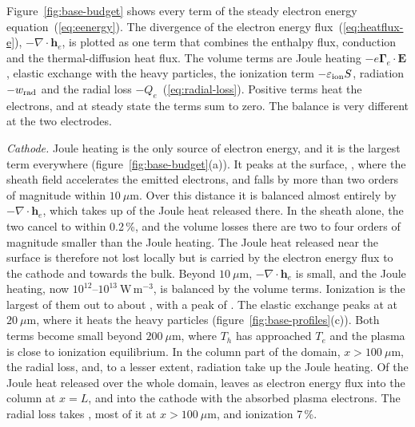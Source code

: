 Figure~\ref{fig:base-budget} shows every term of the steady electron energy equation~(\ref{eq:eenergy}). The divergence of the electron energy flux~(\ref{eq:heatflux-e}), \(-\nabla\cdot\mathbf{h}_e\), is plotted as one term that combines the enthalpy flux, conduction and the thermal-diffusion heat flux. The volume terms are Joule heating \(-e\boldsymbol{\Gamma}_e\cdot\mathbf{E}\), elastic exchange with the heavy particles, the ionization term \(-\varepsilon_{\rm ion}S\), radiation \(-w_{\rm rad}\) and the radial loss \(-Q_e\)~(\ref{eq:radial-loss}). Positive terms heat the electrons, and at steady state the terms sum to zero. The balance is very different at the two electrodes.

\emph{Cathode.} Joule heating is the only source of electron energy, and it is the largest term everywhere (figure~\ref{fig:base-budget}(a)). It peaks at the surface, , where the sheath field accelerates the emitted electrons, and falls by more than two orders of magnitude within \(10\ \mu\)m. Over this distance it is balanced almost entirely by \(-\nabla\cdot\mathbf{h}_e\), which takes up  of the Joule heat released there. In the sheath alone, the two cancel to within 0.2\,\%, and the volume losses there are two to four orders of magnitude smaller than the Joule heating. The Joule heat released near the surface is therefore not lost locally but is carried by the electron energy flux to the cathode and towards the bulk. Beyond \(10\ \mu\)m, \(-\nabla\cdot\mathbf{h}_e\) is small, and the Joule heating, now \(10^{12}\)--\(10^{13}\ \mathrm{W\,m^{-3}}\), is balanced by the volume terms. Ionization is the largest of them out to about , with a peak of . The elastic exchange peaks at  at \(20\ \mu\)m, where it heats the heavy particles (figure~\ref{fig:base-profiles}(c)). Both terms become small beyond \(200\ \mu\)m, where \(T_h\) has approached \(T_e\) and the plasma is close to ionization equilibrium. In the column part of the domain, \(x>100\ \mu\)m, the radial loss,  and, to a lesser extent, radiation take up the Joule heating. Of the Joule heat released over the whole domain,  leaves as electron energy flux into the column at \(x=L\), and  into the cathode with the absorbed plasma electrons. The radial loss takes , most of it at \(x>100\ \mu\)m, and ionization 7\,\%. 

